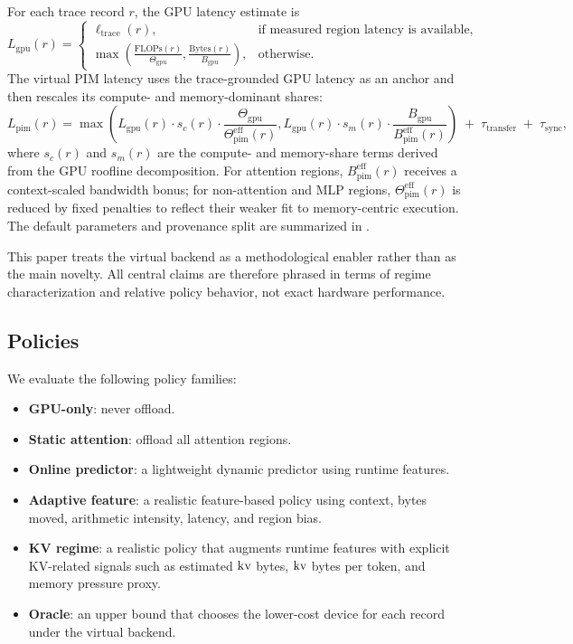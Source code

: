 For each trace record $r$, the GPU latency estimate is
\[
L_{\mathrm{gpu}}(r)=
\begin{cases}
\ell_{\mathrm{trace}}(r), & \text{if measured region latency is available}, \\
\max\!\left(\frac{\mathrm{FLOPs}(r)}{\Theta_{\mathrm{gpu}}}, \frac{\mathrm{Bytes}(r)}{B_{\mathrm{gpu}}}\right), & \text{otherwise}.
\end{cases}
\]
The virtual PIM latency uses the trace-grounded GPU latency as an anchor and then rescales its compute- and memory-dominant shares:
\[
L_{\mathrm{pim}}(r)=
\max\!\left(
L_{\mathrm{gpu}}(r)\cdot s_c(r)\cdot \frac{\Theta_{\mathrm{gpu}}}{\Theta_{\mathrm{pim}}^{\mathrm{eff}}(r)},
L_{\mathrm{gpu}}(r)\cdot s_m(r)\cdot \frac{B_{\mathrm{gpu}}}{B_{\mathrm{pim}}^{\mathrm{eff}}(r)}
\right)
\;+\;
\tau_{\mathrm{transfer}}
\;+\;
\tau_{\mathrm{sync}},
\]
where $s_c(r)$ and $s_m(r)$ are the compute- and memory-share terms derived from the GPU roofline decomposition. For attention regions, $B_{\mathrm{pim}}^{\mathrm{eff}}(r)$ receives a context-scaled bandwidth bonus; for non-attention and MLP regions, $\Theta_{\mathrm{pim}}^{\mathrm{eff}}(r)$ is reduced by fixed penalties to reflect their weaker fit to memory-centric execution. The default parameters and provenance split are summarized in .




This paper treats the virtual backend as a methodological enabler rather than as the main novelty. All central claims are therefore phrased in terms of regime characterization and relative policy behavior, not exact hardware performance.

\subsection{Policies}

We evaluate the following policy families:
\begin{itemize}
\item \textbf{GPU-only}: never offload.
\item \textbf{Static attention}: offload all attention regions.
\item \textbf{Online predictor}: a lightweight dynamic predictor using runtime features.
\item \textbf{Adaptive feature}: a realistic feature-based policy using context, bytes moved, arithmetic intensity, latency, and region bias.
\item \textbf{KV regime}: a realistic policy that augments runtime features with explicit KV-related signals such as estimated $\mathrm{kv}$ bytes, $\mathrm{kv}$ bytes per token, and memory pressure proxy.
\item \textbf{Oracle}: an upper bound that chooses the lower-cost device for each record under the virtual backend.
\end{itemize}

